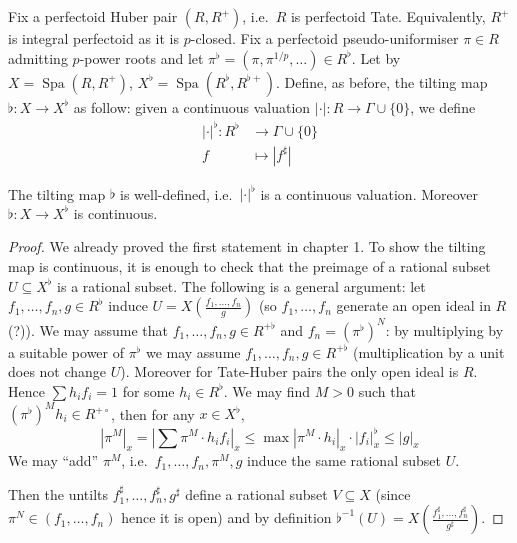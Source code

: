 \documentclass[a4paper]{article}
\newcommand{\tilt}{\flat} %
\DeclareMathOperator{\Spa}{Spa}
\DeclareMathOperator{\Spa}{Spa}
\begin{document}
Fix a perfectoid Huber pair \((R, R^+)\), i.e.\ \(R\) is perfectoid Tate. Equivalently, \(R^+\) is integral perfectoid as it is \(p\)-closed. Fix a perfectoid pseudo-uniformiser \(\pi \in R\) admitting \(p\)-power roots and let \(\pi^\tilt = (\pi, \pi^{1/p}, \dots) \in R^\tilt\). Let by \(X = \Spa(R, R^+)\), \(X^\tilt = \Spa(R^\tilt, R^{\tilt +})\). Define, as before, the tilting map \(\tilt: X \to X^\tilt\) as follow: given a continuous valuation \(|\cdot|: R \to \Gamma \cup \{0\}\), we define
\begin{align*}
  |\cdot|^\tilt: R^\tilt &\to \Gamma \cup \{0\} \\
  f &\mapsto |f^\sharp|
\end{align*}

\begin{lemma}
  The tilting map \(\tilt\) is well-defined, i.e.\ \(|\cdot|^\tilt\) is a continuous valuation. Moreover \(\tilt: X \to X^\tilt\) is continuous.
\end{lemma}

\begin{proof}
  We already proved the first statement in chapter 1. To show the tilting map is continuous, it is enough to check that the preimage of a rational subset \(U \subseteq X^\tilt\) is a rational subset. The following is a general argument: let \(f_1, \dots, f_n, g \in R^\tilt\) induce \(U = X(\frac{f_1, \dots, f_n}{g})\) (so \(f_1, \dots, f_n\) generate an open ideal in \(R\) (?)). We may assume that \(f_1, \dots, f_n, g \in R^{+ \tilt}\) and \(f_n = (\pi^\tilt)^N\): by multiplying by a suitable power of \(\pi^\tilt\) we may assume \(f_1, \dots, f_n, g \in R^{+ \tilt}\) (multiplication by a unit does not change \(U\)). Moreover for Tate-Huber pairs the only open ideal is \(R\). Hence \(\sum h_if_i = 1\) for some \(h_i \in R^\tilt\). We may find \(M > 0\) such that \((\pi^\tilt)^Mh_i \in R^{+ \circ}\), then for any \(x \in X^\tilt\),
  \[
    |\pi^M|_x = |\sum \pi^M \cdot h_if_i|_x \leq \max |\pi^M \cdot h_i|_x \cdot |f_i|_x^\tilt \leq |g|_x
  \]
  We may ``add'' \(\pi^M\), i.e.\ \(f_1, \dots, f_n, \pi^M, g\) induce the same rational subset \(U\).

  Then the untilts \(f_1^\sharp, \dots, f_n^\sharp, g^\sharp\) define a rational subset \(V \subseteq X\) (since \(\pi^N \in (f_1, \dots, f_n)\) hence it is open) and by definition \(\tilt^{-1}(U) = X(\frac{f_1^\sharp, \dots, f_n^\sharp}{g^\sharp})\).
\end{proof}
\end{document}

